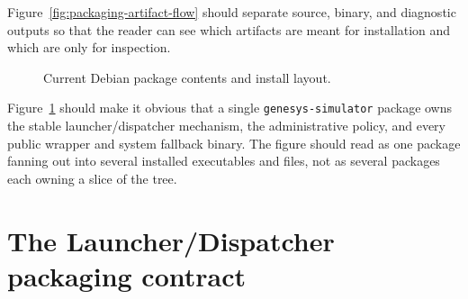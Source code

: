 Figure~\ref{fig:packaging-artifact-flow} should separate source, binary, and
diagnostic outputs so that the reader can see which artifacts are meant for
installation and which are only for inspection.

\begin{figure}[htbp]
\centering
\caption{Current Debian package contents and install layout.}
\label{fig:packaging-package-layout}
\end{figure}

Figure~\ref{fig:packaging-package-layout} should make it obvious that a single
\texttt{genesys-simulator} package owns the stable launcher/dispatcher
mechanism, the administrative policy, and every public wrapper and system
fallback binary. The figure should read as one package fanning out into
several installed executables and files, not as several packages each owning
a slice of the tree.

\section{The Launcher/Dispatcher packaging contract}
\label{sec:packaging-launcher-contract}

